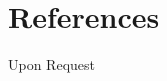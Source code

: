 \documentclass[11pt,a4paper,sans,swahili]{moderncv}
\begin{document}
	\section{References}
	Upon Request
	\begin{comment}
		
	
	\begin{center}
		\begin{tabular}{p{6cm}p{8cm}}
			\textbf{Rîrîma:} & Dr. Mundia S.M, Lecturer\\
			\textbf{Wîra:} & Project Coordinator\\
			\textbf{Gîthûragîro:} & Dedan Kimathi University of Technology \\
			\textbf{Mawasiliano:} & +254 721 302 869\\
			\textbf{Barua Pepe:} & simon.maina@dkut.ac.ke \\
			\\
			\textbf{Rîrîma:} & Dr. Omari Cyprian \\
			\textbf{Wîra:} & Chairman \\
			\textbf{Gîthûragîro:} & BSc Statistics and Actuarial Science, Dedan Kimathi University of Technology \\
			\textbf{Mawasiliano:} & +254 722 616 725 \\
			\textbf{Barua Pepe:} & cyomari@dkut.ac.ke \\
			\\
			\textbf{Rîrîma:} & Julius Miheso \\
			\textbf{Wîra:} & Internal Auditor \\
			\textbf{Gîthûragîro:} & NSSF \\
			\textbf{Mawasiliano:} & +254 720 652 682 \\
			\textbf{Barua Pepe:} & atsiaya80@gmail.com \\
			\\
			\textbf{Rîrîma:} & Gideon Ngome \\
			\textbf{Wîra:} & Risk Manager \\
			\textbf{Gîthûragîro:} & NSSF \\
			\textbf{Mawasiliano:} & +254 746 595 822 \\
			\textbf{Barua Pepe:} & ngomegideon@yahoo.com \\
		\end{tabular}
	\end{center}
\end{comment}
\end{document}
